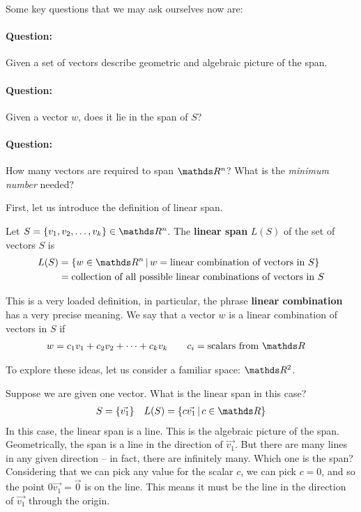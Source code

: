 \documentclass[11pt]{article}
\newcommand{\ques}{\paragraph{Question:}}
\newcommand{\keyphrase}{\textbf}
\begin{document}
%


Some key questions that we may ask ourselves now are:
\ques Given a set of vectors describe geometric and algebraic picture of the span.

\ques Given a vector $w$, does it lie in the span of $S$?

\ques How many vectors are required to span $\bbR^n$? What is the \emph{minimum number} needed?

First, let us introduce the definition of linear span.

\begin{minipage}[t]{.95\textwidth}
Let $S = \left\{ v_1, v_2, \dots, v_k \right\} \in \bbR^n$. The \keyphrase{linear span} $L(S)$ of the set of vectors $S$ is
\begin{align*}
L(S) &= \left\{ w \in \bbR^n \,|\, w = \text{linear combination of vectors in $S$} \right\}
\\
&= \text{collection of all possible linear combinations of vectors in $S$}
\end{align*}
\end{minipage}


This is a very loaded definition, in particular, the phrase \keyphrase {linear combination} has a very precise meaning. We say that a vector $w$ is a linear combination of vectors in $S$ if
\begin{align*}
w &= c_1 v_1 + c_2 v_2 + \dots + c_k v_k \qquad c_i = \text{scalars from $\bbR$}
\end{align*}

\vspace{1cm}

To explore these ideas, let us consider a familiar space: $\bbR^2$.

Suppose we are given one vector. What is the linear span in this case?
\begin{align*}
S = \left\{ \vec{v_1} \right\}
&&
L(S) = \left\{ c \vec{v_1} \,|\, c \in \bbR \right\}
\end{align*}
In this case, the linear span is a line. This is the algebraic picture of the span. Geometrically, the span is a line in the direction of $\vec{v_1}$. But there are many lines in any given direction -- in fact, there are infinitely many.  Which one is the span? Considering that we can pick any value for the scalar $c$, we can pick $c=0$, and so the point $0 \vec{v_1} = \vec{0}$ is on the line. This means it must be the line in the direction of $\vec{v_1}$ through the origin.
\end{document}
